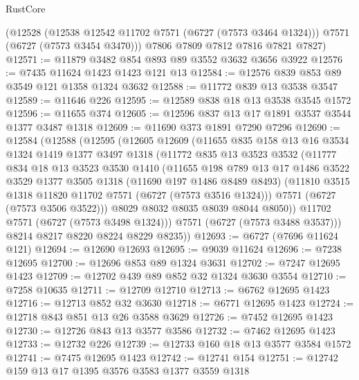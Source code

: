\begin{lexlean}{RustCore}
\begin{coremodule}
      (@12528
        (@12538 @12542 @11702 @7571 (@6727 (@7573 @3464 @1324)))
        @7571
        (@6727 (@7573 @3454 @3470)))
      @7806
      @7809
      @7812
      @7816
      @7821
      @7827)
@12571 := @11879 @3482 @854 @893 @89 @3552 @3632 @3656 @3922
@12576 := @7435 @11624 @1423 @1423 @121 @13
@12584 := @12576 @839 @853 @89 @3549 @121 @1358 @1324 @3632
@12588 := @11772 @839 @13 @3538 @3547
@12589 := @11646 @226
@12595 := @12589 @838 @18 @13 @3538 @3545 @1572
@12596 := @11655 @374
@12605 := @12596 @837 @13 @17 @1891 @3537 @3544 @1377 @3487 @1318
@12609 := @11690 @373 @1891 @7290 @7296
@12690 := @12584
    (@12588
      (@12595
        (@12605
          @12609
          (@11655
            @835
            @158
            @13
            @16
            @3534
            @1324
            @1419
            @1377
            @3497
            @1318
            (@11772
              @835
              @13
              @3523
              @3532
              (@11777
                @834
                @18
                @13
                @3523
                @3530
                @1410
                (@11655
                  @198
                  @789
                  @13
                  @17
                  @1486
                  @3522
                  @3529
                  @1377
                  @3505
                  @1318
                  (@11690 @197 @1486 @8489 @8493)
                  (@11810 @3515 @1318 @11820 @11702 @7571 (@6727 (@7573 @3516 @1324)))
                  @7571
                  (@6727 (@7573 @3506 @3522)))
                @8029
                @8032
                @8035
                @8039
                @8044
                @8050))
            @11702
            @7571
            (@6727 (@7573 @3498 @1324)))
          @7571
          (@6727 (@7573 @3488 @3537)))
        @8214
        @8217
        @8220
        @8224
        @8229
        @8235))
@12693 := @6727 (@7696 @11624 @121)
@12694 := @12690 @12693
@12695 := @9039 @11624
@12696 := @7238 @12695
@12700 := @12696 @853 @89 @1324 @3631
@12702 := @7247 @12695 @1423
@12709 := @12702 @439 @89 @852 @32 @1324 @3630 @3554
@12710 := @7258 @10635
@12711 := @12709 @12710
@12713 := @6762 @12695 @1423
@12716 := @12713 @852 @32 @3630
@12718 := @6771 @12695 @1423
@12724 := @12718 @843 @851 @13 @26 @3588 @3629
@12726 := @7452 @12695 @1423
@12730 := @12726 @843 @13 @3577 @3586
@12732 := @7462 @12695 @1423
@12733 := @12732 @226
@12739 := @12733 @160 @18 @13 @3577 @3584 @1572
@12741 := @7475 @12695 @1423
@12742 := @12741 @154
@12751 := @12742 @159 @13 @17 @1395 @3576 @3583 @1377 @3559 @1318

\end{coremodule}
\end{lexlean}
